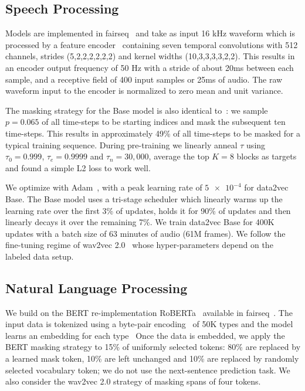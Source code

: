 \documentclass[nohyperref]{article}
\theoremstyle{plain}
\theoremstyle{definition}
\theoremstyle{remark}
\newcommand{\name}{data2vec}
\newcommand{\Enot}[1]{\num[exponent-product = \times]{#1}}
\begin{document}
\subsection{Speech Processing}
\label{sec:setup_speech}

Models are implemented in fairseq~\cite{ott2019fairseq} and take as input 16 kHz waveform which is processed by a feature encoder~\citep{baevski2020wav} containing seven temporal convolutions with 512 channels, strides (5,2,2,2,2,2,2) and kernel widths (10,3,3,3,3,2,2).
This results in an encoder output frequency of 50 Hz with a stride of about 20ms between each sample, and a receptive field of 400 input samples or 25ms of audio. 
The raw waveform input to the encoder is normalized to zero mean and unit variance.

The masking strategy for the Base model is also identical to~\citet{baevski2020wav}: we sample $p=0.065$ of all time-steps to be starting indices and mask the subsequent ten time-steps.
This results in approximately 49\% of all time-steps to be masked for a typical training sequence.
During pre-training we linearly anneal $\tau$ using $\tau_0=0.999$, $\tau_e=0.9999$ and $\tau_n=30,000$, average the top $K=8$ blocks as targets and found a simple L2 loss to work well.

We optimize with Adam~\citep{kingma2015adam}, with a peak learning rate of $\Enot{5e-4}$ for \name{} Base. The Base model uses a tri-stage scheduler which linearly warms up the learning rate over the first 3\% of updates, holds it for 90\% of updates and then linearly decays it over the remaining 7\%. 
We train \name{} Base for 400K updates with a batch size of 63 minutes of audio (61M frames).
We follow the fine-tuning regime of wav2vec 2.0~\citep{baevski2020wav} whose hyper-parameters depend on the labeled data setup.


\subsection{Natural Language Processing}
\label{sec:setup_nlp}

We build on the BERT re-implementation RoBERTa~\citep{liu2019roberta} available in fairseq~\citep{ott2019fairseq}.
The input data is tokenized using a byte-pair encoding~\citep{sennrich2016bpe} of 50K types and the model learns an embedding for each type~\citep{devlin2018bert,liu2019roberta} 
Once the data is embedded, we apply the BERT masking strategy to 15\% of uniformly selected tokens: 
80\% are replaced by a learned mask token, 10\% are left unchanged and 10\% are replaced by randomly selected vocabulary token; we do not use the next-sentence prediction task. 
We also consider the wav2vec 2.0 strategy of masking spans of four tokens.
\end{document}

